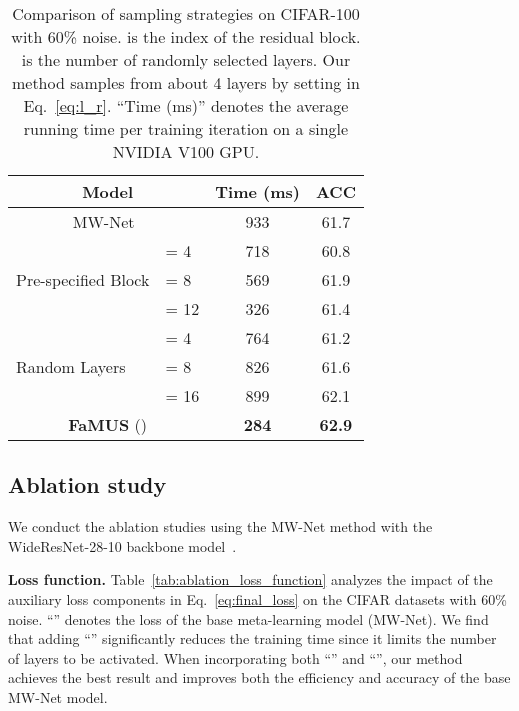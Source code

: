 \documentclass[final]{cvpr}
\begin{document}
\begin{table}[t]
	\centering
	\small
	\begin{tabular}{|l|l|c|c|}
		\hline
		\multicolumn{2}{|c|}{Model} & Time (ms) & ACC   \\
		\hline
        \multicolumn{2}{|c|}{MW-Net~\cite{shu2019meta}} & 933 & 61.7  \\
		\hline
		\multirow{3}{*}{ Pre-specified Block} &  = 4  & 718 & 60.8  \\
                                           &  = 8  & 569 & 61.9  \\
                                           &  = 12 & 326 & 61.4  \\
        \hline
        \multirow{3}{*}{ Random Layers} &  = 4  & 764 & 61.2  \\
                                       &  = 8  & 826 & 61.6  \\
                                       &  = 16 & 899 & 62.1  \\
		\hline\hline
		\multicolumn{2}{|c|}{\textbf{FaMUS} ()} & \textbf{284} & \textbf{62.9}  \\  
		\hline
	\end{tabular}
	\vspace{-1mm}
	\caption{Comparison of sampling strategies on CIFAR-100 with 60\% noise.  is the index of the residual block.  is the number of randomly selected layers. Our method samples from about 4 layers by setting  in Eq.~\eqref{eq:l_r}. ``Time (ms)'' denotes the average running time per training iteration on a single NVIDIA V100 GPU.
	}\label{tab:ablation_diff_accumulation}
	\vspace{-5mm}
\end{table}
 

\subsection{Ablation study}\label{sec:ablation_study}
We conduct the ablation studies using the MW-Net method with the WideResNet-28-10 backbone model~\cite{zagoruyko2016wide}.

\textbf{Loss function.} Table~\ref{tab:ablation_loss_function} analyzes the impact of the auxiliary loss components in Eq.~\eqref{eq:final_loss} on the CIFAR datasets with 60\% noise. ``'' denotes the loss of the base meta-learning model (MW-Net).
We find that adding ``'' significantly reduces the training time since it limits the number of layers to be activated. 
When incorporating both ``'' and ``'', our method achieves the best result and improves both the efficiency and accuracy of the base MW-Net model.
\end{document}
